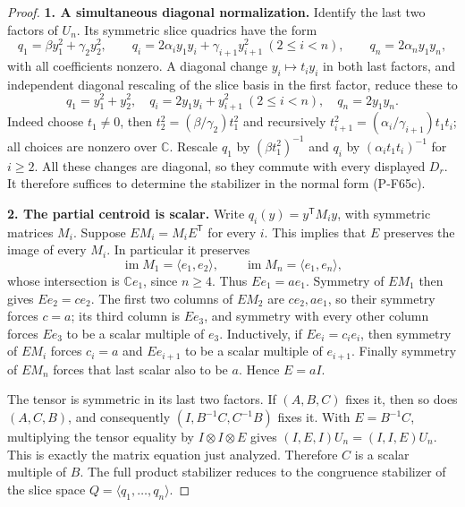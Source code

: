 \begin{proof}
\par\medskip\noindent\textbf{1. A simultaneous diagonal normalization.}\quad 
Identify the last two factors of $U_n$.  Its symmetric slice quadrics
have the form
\[
 q_1=\beta y_1^2+\gamma_2y_2^2,\qquad
 q_i=2\alpha_i y_1y_i+\gamma_{i+1}y_{i+1}^2\ (2\le i<n),
 \qquad q_n=2\alpha_n y_1y_n,
\]
with all coefficients nonzero.  A diagonal change $y_i\mapsto t_i y_i$
in both last factors, and independent diagonal rescaling of the slice
basis in the first factor, reduce these to
\[
 q_1=y_1^2+y_2^2,\quad
 q_i=2y_1y_i+y_{i+1}^2\ (2\le i<n),\quad q_n=2y_1y_n. \tag{P-F65c}
\]
Indeed choose $t_1\ne0$, then
$t_2^2=(\beta/\gamma_2)t_1^2$ and recursively
$t_{i+1}^2=(\alpha_i/\gamma_{i+1})t_1t_i$; all choices are nonzero
over $\mathbb C$.  Rescale $q_1$ by $(\beta t_1^2)^{-1}$ and
$q_i$ by $(\alpha_i t_1t_i)^{-1}$ for $i\ge2$.
All these changes are diagonal, so they commute with every displayed
$D_r$.  It therefore suffices to determine the stabilizer in the
normal form (P-F65c).

\par\medskip\noindent\textbf{2. The partial centroid is scalar.}\quad 
Write $q_i(y)=y^{\mathsf T}M_i y$, with symmetric matrices $M_i$.
Suppose $E M_i=M_iE^{\mathsf T}$ for every $i$.  This implies that
$E$ preserves the image of every $M_i$.  In particular it preserves
\[
 \operatorname{im}M_1=\langle e_1,e_2\rangle,
 \qquad \operatorname{im}M_n=\langle e_1,e_n\rangle,
\]
whose intersection is $\mathbb C e_1$, since $n\ge4$.
Thus $Ee_1=a e_1$.  Symmetry of $EM_1$ then gives $Ee_2=c e_2$.
The first two columns of $EM_2$ are $c e_2,a e_1$, so their
symmetry forces $c=a$; its third column is $Ee_3$, and symmetry
with every other column forces $Ee_3$ to be a scalar multiple of
$e_3$.  Inductively, if $Ee_i=c_i e_i$, then symmetry of $EM_i$
forces $c_i=a$ and $Ee_{i+1}$ to be a scalar multiple of $e_{i+1}$.
Finally symmetry of $EM_n$ forces that last scalar also to be $a$.
Hence $E=aI$.

The tensor is symmetric in its last two factors.  If $(A,B,C)$ fixes
it, then so does $(A,C,B)$, and consequently
$(I,B^{-1}C,C^{-1}B)$ fixes it.  With $E=B^{-1}C$, multiplying the
tensor equality by $I\otimes I\otimes E$ gives
$(I,E,I)U_n=(I,I,E)U_n$.  This is exactly the matrix equation just
analyzed.  Therefore $C$ is a scalar multiple of $B$.
The full product stabilizer reduces to the congruence stabilizer of
the slice space $Q=\langle q_1,\ldots,q_n\rangle$.


\end{proof}
